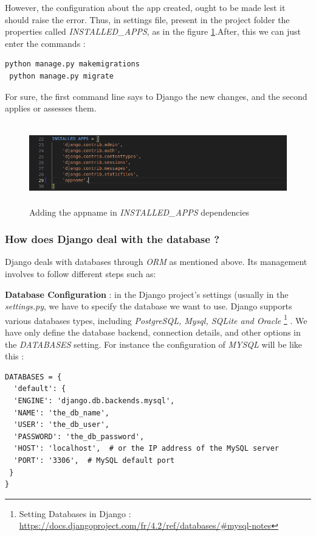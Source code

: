 \documentclass[12pt,a4paper]{report}
\begin{document}
 \newline However, the configuration about the app created, ought to be made lest it should raise the error. Thus, in settings file, present in the project folder the properties called \textit{INSTALLED\_APPS}, as in the figure \ref{fig:appinstallname}.\newline After, this we can just enter the commands : 
 \begin{lstlisting}[style=stylepython]
 python manage.py makemigrations
 python manage.py migrate
\end{lstlisting}
For sure, the first command line says to Django the new changes, and the second applies or assesses them. 
\begin{figure}
	\centering
	\includegraphics[width=1\linewidth, height=3.5cm]{appInstallName}
	\caption{Adding the appname in \textit{INSTALLED\_APPS} dependencies }
	\label{fig:appinstallname}
\end{figure} 

\subsubsection*{How does Django deal with the database ?} 
Django deals with databases through \textit{ORM} as mentioned above. Its management involves to follow different steps such as:

\textbf{Database Configuration } : in the Django project's settings (usually in the \textit{settings.py}, we have to specify the database we want to use. Django supports various databases types, including \textit{PostgreSQL, Mysql, SQLite and Oracle} \footnote{Setting Databases in Django : \url{https://docs.djangoproject.com/fr/4.2/ref/databases/\#mysql-notes}}  . We have only define the database backend, connection details, and other options in the \textit{DATABASES} setting. For instance the configuration of \textit{MYSQL} will be like this : 
\begin{lstlisting}[style=stylepython]
DATABASES = {
  'default': {
  'ENGINE': 'django.db.backends.mysql',
  'NAME': 'the_db_name',
  'USER': 'the_db_user',
  'PASSWORD': 'the_db_password',
  'HOST': 'localhost',  # or the IP address of the MySQL server
  'PORT': '3306',  # MySQL default port
 }
}
\end{lstlisting} 
\end{document}
